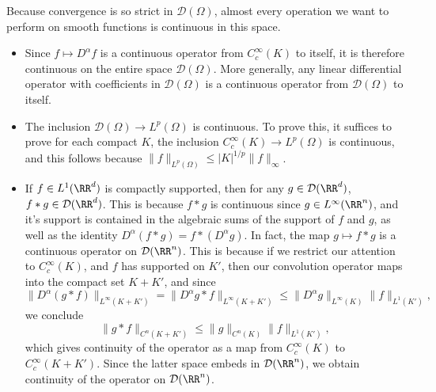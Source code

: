 Because convergence is so strict in $\mathcal{D}(\Omega)$, almost every operation we want to perform on smooth functions is continuous in this space.
%
\begin{itemize}
    \item Since $f \mapsto D^\alpha f$ is a continuous operator from $C_c^\infty(K)$ to itself, it is therefore continuous on the entire space $\mathcal{D}(\Omega)$. More generally, any linear differential operator with coefficients in $\mathcal{D}(\Omega)$ is a continuous operator from $\mathcal{D}(\Omega)$ to itself.

    \item The inclusion $\mathcal{D}(\Omega) \to L^p(\Omega)$ is continuous. To prove this, it suffices to prove for each compact $K$, the inclusion $C_c^\infty(K) \to L^p(\Omega)$ is continuous, and this follows because $\| f \|_{L^p(\Omega)} \leq |K|^{1/p} \| f \|_\infty$.

    \item If $f \in L^1(\RR^d)$ is compactly supported, then for any $g \in \mathcal{D}(\RR^d)$, $f * g \in \mathcal{D}(\RR^d)$. This is because $f * g$ is continuous since $g \in L^\infty(\RR^n)$, and it's support is contained in the algebraic sums of the support of $f$ and $g$, as well as the identity $D^\alpha(f * g) = f * (D^\alpha g)$. In fact, the map $g \mapsto f * g$ is a continuous operator on $\mathcal{D}(\RR^n)$. This is because if we restrict our attention to $C_c^\infty(K)$, and $f$ has supported on $K'$, then our convolution operator maps into the compact set $K+K'$, and since
    \[ \| D^\alpha (g * f) \|_{L^\infty(K + K')} = \| D^\alpha g * f \|_{L^\infty(K + K')} \leq \| D^\alpha g \|_{L^\infty(K)} \| f \|_{L^1(K')}, \]
    we conclude
    \[ \| g * f \|_{C^n(K+K')} \leq \| g \|_{C^n(K)} \| f \|_{L^1(K')}, \]
    which gives continuity of the operator as a map from $C_c^\infty(K)$ to $C_c^\infty(K+K')$. Since the latter space embeds in $\mathcal{D}(\RR^n)$, we obtain continuity of the operator on $\mathcal{D}(\RR^n)$.
\end{itemize}

